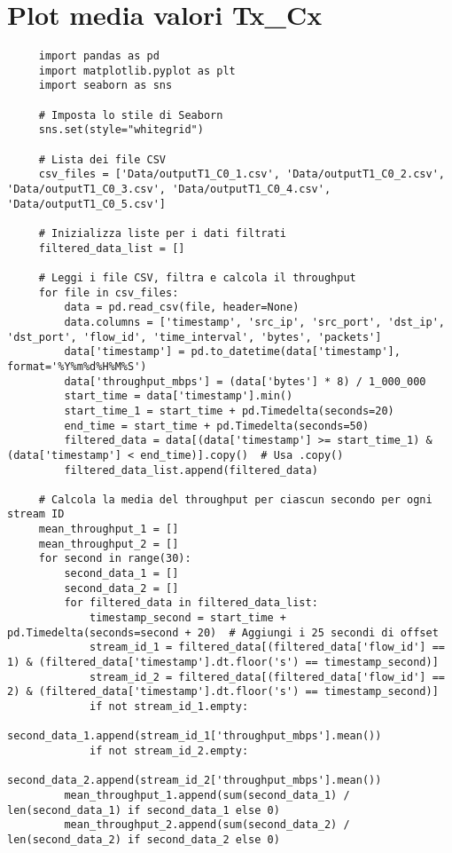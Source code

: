 \section{Plot media valori Tx\_Cx}
\label{plot_test1}
\begin{lstlisting}
     import pandas as pd
     import matplotlib.pyplot as plt
     import seaborn as sns
     
     # Imposta lo stile di Seaborn
     sns.set(style="whitegrid")
     
     # Lista dei file CSV
     csv_files = ['Data/outputT1_C0_1.csv', 'Data/outputT1_C0_2.csv', 'Data/outputT1_C0_3.csv', 'Data/outputT1_C0_4.csv', 'Data/outputT1_C0_5.csv']
     
     # Inizializza liste per i dati filtrati
     filtered_data_list = []
     
     # Leggi i file CSV, filtra e calcola il throughput
     for file in csv_files:
         data = pd.read_csv(file, header=None)
         data.columns = ['timestamp', 'src_ip', 'src_port', 'dst_ip', 'dst_port', 'flow_id', 'time_interval', 'bytes', 'packets']
         data['timestamp'] = pd.to_datetime(data['timestamp'], format='%Y%m%d%H%M%S')
         data['throughput_mbps'] = (data['bytes'] * 8) / 1_000_000
         start_time = data['timestamp'].min()
         start_time_1 = start_time + pd.Timedelta(seconds=20)
         end_time = start_time + pd.Timedelta(seconds=50)
         filtered_data = data[(data['timestamp'] >= start_time_1) & (data['timestamp'] < end_time)].copy()  # Usa .copy()
         filtered_data_list.append(filtered_data)
     
     # Calcola la media del throughput per ciascun secondo per ogni stream ID
     mean_throughput_1 = []
     mean_throughput_2 = []
     for second in range(30):
         second_data_1 = []
         second_data_2 = []
         for filtered_data in filtered_data_list:
             timestamp_second = start_time + pd.Timedelta(seconds=second + 20)  # Aggiungi i 25 secondi di offset
             stream_id_1 = filtered_data[(filtered_data['flow_id'] == 1) & (filtered_data['timestamp'].dt.floor('s') == timestamp_second)]
             stream_id_2 = filtered_data[(filtered_data['flow_id'] == 2) & (filtered_data['timestamp'].dt.floor('s') == timestamp_second)]
             if not stream_id_1.empty:
                 second_data_1.append(stream_id_1['throughput_mbps'].mean())
             if not stream_id_2.empty:
                 second_data_2.append(stream_id_2['throughput_mbps'].mean())
         mean_throughput_1.append(sum(second_data_1) / len(second_data_1) if second_data_1 else 0)
         mean_throughput_2.append(sum(second_data_2) / len(second_data_2) if second_data_2 else 0)
     

\end{lstlisting}
